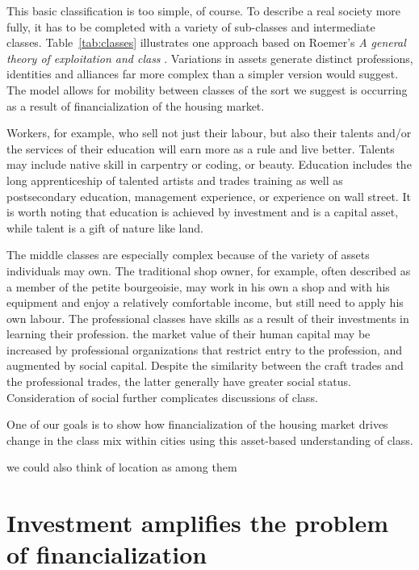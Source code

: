 This basic classification is too simple, of course. To describe a real society more fully, it has to be completed with a variety of sub-classes and intermediate classes. Table~\ref{tab:classes} illustrates one approach based on Roemer's  \textit{A general theory of exploitation and class} \cite{roemerGeneralTheoryExploitation1982}. Variations in assets generate distinct professions, identities and alliances far more complex than a simpler version would suggest. The model allows for mobility between classes of the sort we suggest is occurring as a result of financialization of the housing market.

Workers, for example, who sell not just their labour, but also their talents and/or the services of their education will earn more as a rule and live better. Talents may include native skill in carpentry or coding, or beauty. Education includes the long apprenticeship of talented artists and  trades training as well as postsecondary education, management experience, or experience on wall street. It is worth noting that education is achieved by investment and is a capital asset, while talent is a gift of nature like land. 

The middle classes are especially complex because of the variety of assets individuals may own. The traditional shop owner, for example, often described as a member of the \gls{petite bourgeoisie}, may work in his own a shop and with his equipment and enjoy a relatively comfortable income, but still  need to apply his own labour. The professional classes have skills as a result of their investments in learning their profession. the market value of their human capital may be increased by professional organizations that restrict entry to the profession, and augmented by social capital.  Despite the similarity between the craft trades and the professional trades, the latter generally have greater social status. Consideration of social  further complicates discussions of class.

One of our goals is  to show how financialization of the housing market drives change in the class mix within cities using this asset-based understanding of class.





we could also think of location as among them





\section{Investment amplifies the problem of financialization}
